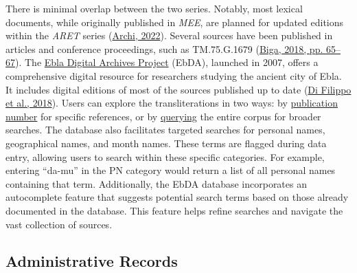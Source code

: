 \documentclass[
]{book}
\begin{document}
There is minimal overlap between the two series. Notably, most lexical documents, while originally published in \emph{MEE}, are planned for updated editions within the \emph{ARET} series (\protect\hyperlink{ref-Archi2022b}{Archi, 2022}). Several sources have been published in articles and conference proceedings, such as TM.75.G.1679 (\protect\hyperlink{ref-Biga2018b}{Biga, 2018, pp. 65--67}).
The \href{http://ebda.cnr.it/}{Ebla Digital Archives Project} (EbDA), launched in 2007, offers a comprehensive digital resource for researchers studying the ancient city of Ebla. It includes digital editions of most of the sources published up to date (\protect\hyperlink{ref-DiFilippoEtAl2018}{Di Filippo et al., 2018}). Users can explore the transliterations in two ways: by \href{http://ebda.cnr.it/tablet/list}{publication number} for specific references, or by \href{http://ebda.cnr.it/tablet/search}{querying} the entire corpus for broader searches. The database also facilitates targeted searches for personal names, geographical names, and month names. These terms are flagged during data entry, allowing users to search within these specific categories. For example, entering ``da-mu'' in the PN category would return a list of all personal names containing that term.
Additionally, the EbDA database incorporates an autocomplete feature that suggests potential search terms based on those already documented in the database. This feature helps refine searches and navigate the vast collection of sources.

\hypertarget{administrative-records}{%
\subsection{Administrative Records}\label{administrative-records}}
\end{document}
